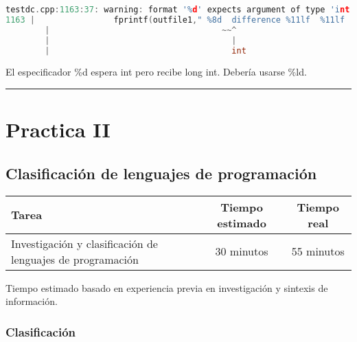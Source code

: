 \documentclass[12pt,a4paper]{article}
\newcommand{\separadorseccion}{%
    \vspace{1em}
    \hrule
    \vspace{1em}
}
\begin{document}
\begin{lstlisting}[language=C++]
testdc.cpp:1163:37: warning: format '%d' expects argument of type 'int', but argument 3 has type 'long int' [-Wformat=]
1163 |                fprintf(outfile1," %8d  difference %11lf  %11lf  %11lf km %12lf m \n\n",satrec.satnum, dr[0], dr[1], dr[2], 1000.0 * mag(dr) );
        |                                   ~~^                                                  ~~~~~~~~~~~~~
        |                                     |                                                         |
        |                                     int                                                       long int
\end{lstlisting}

El especificador \%d espera int pero recibe long int. Debería usarse \%ld.


\separadorseccion


\section{Practica II}


\subsection{Clasificación de lenguajes de programación}
    \begin{center}
        \begin{tabular}{|l|c|c|}
            \hline
            \textbf{Tarea} & \textbf{Tiempo estimado} & \textbf{Tiempo real} \\
            \hline
            Investigación y clasificación de lenguajes de programación & 30 minutos & 55 minutos \\
            \hline
        \end{tabular}
    \end{center}
    \begin{center}
        Tiempo estimado basado en experiencia previa en investigación y sintexis de información.
    \end{center}
\subsubsection{Clasificación}
\end{document}
